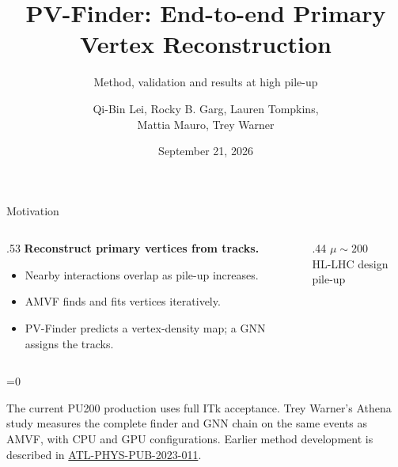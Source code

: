 \documentclass[xcolor=table,aspectratio=169]{beamer}
\title[PV-Finder]{PV-Finder: End-to-end Primary Vertex Reconstruction}
\subtitle{Method, validation and results at high pile-up}
\author[Mattia Mauro]{Qi-Bin Lei, Rocky B. Garg, Lauren Tompkins,\\\textcolor{pennred}{Mattia Mauro}, Trey Warner}
\institute[]{Stanford University}
\date{September 21, 2026}
\def\thisframelogos{}
\newcommand{\framelogo}[1]{\def\thisframelogos{#1}}
\providecommand{\talkbuild}{0}
\newcommand{\readingonly}[1]{\ifnum\talkbuild=0\relax#1\fi}
\newcommand{\readingnote}[1]{\readingonly{\par\vspace{.35em}%
  {\footnotesize\color{black!65}#1\par}}}
\newcommand{\bigvalue}[2]{{\LARGE\bfseries\textcolor{pennred}{#1}}\\[.4em]{\small #2}\par}
\newcommand{\pubnote}{\href{https://cds.cern.ch/record/2858348}{ATL-PHYS-PUB-2023-011}}
\begin{document}
\framelogo{}

\begin{frame}[plain]\titlepage\end{frame}

\begin{frame}{Motivation}
\relax
\begin{columns}[c]\begin{column}{.53\linewidth}
\textbf{Reconstruct primary vertices from tracks.}
\par\vspace{1em}
\begin{itemize}\setlength\itemsep{.7em}
\item Nearby interactions overlap as pile-up increases.
\item AMVF finds and fits vertices iteratively.
\item PV-Finder predicts a vertex-density map; a GNN assigns the tracks.
\end{itemize}
\end{column}\begin{column}{.44\linewidth}\centering
\bigvalue{$\mu\sim200$}{HL-LHC design pile-up}
\par\vspace{1.5em}
\end{column}\end{columns}\readingnote{The current PU200 production uses full ITk acceptance. Trey Warner's Athena study measures the complete finder and GNN chain on the same events as AMVF, with CPU and GPU configurations. Earlier method development is described in \pubnote.}
\end{frame}
\end{document}
